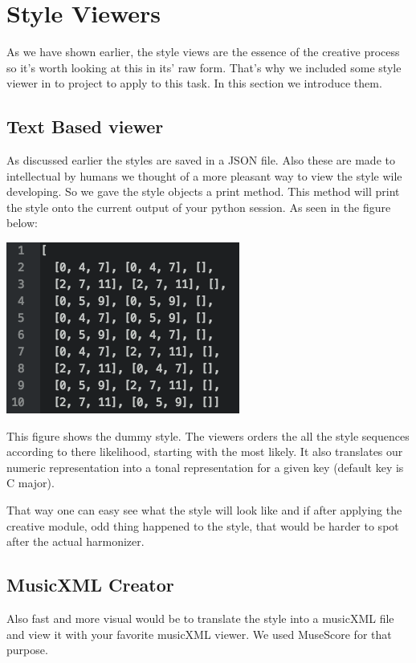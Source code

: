 \section{Style Viewers} 
As we have shown earlier, the style views are the essence of the creative process so it's worth looking at this in its' raw form. That's why we included some style viewer in to project to apply to this task. In this section we introduce them.

\subsection{Text Based viewer}
As discussed earlier the styles are saved in a JSON file. Also these are made to intellectual by humans we thought of a more pleasant way to view the style wile developing. So we gave the style objects a print method. This method will print the style onto the current output of your python session. As seen in the figure below:

\includegraphics[scale=1]{Chapters/pic/text_print.png}

This figure shows the dummy style. The viewers orders the all the style sequences according to there likelihood, starting with the most likely.  It also translates our numeric representation into a tonal representation for a given key (default key is C major).

That way one can easy see what the style will look like and if after applying the creative module, odd thing happened to the style, that would be harder to spot after the actual harmonizer. 

\subsection{MusicXML Creator}
Also fast and more visual would be to translate the style into a musicXML file and view it with your favorite musicXML viewer. We used MuseScore for that purpose. 

